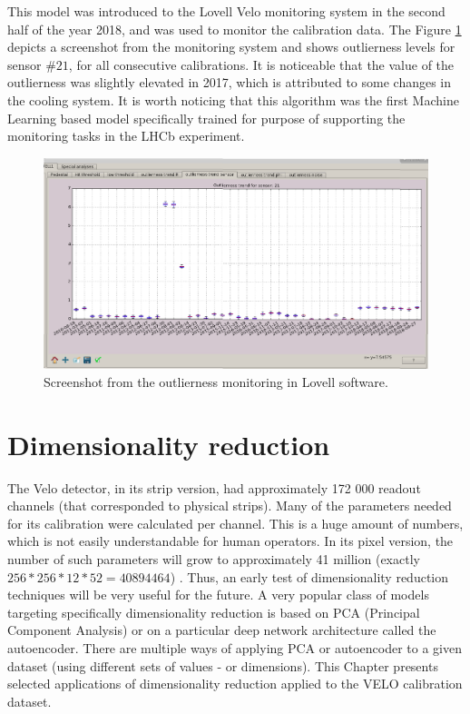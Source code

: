This model was introduced to the Lovell Velo monitoring system in the second half of the year 2018, and was used to monitor the calibration data. The Figure \ref{plot:gui} depicts a screenshot from the monitoring system and shows outlierness levels for sensor $\#21$, for all consecutive calibrations. It is noticeable that the value of the outlierness was slightly elevated in 2017, which is attributed to some changes in the cooling system. It is worth noticing that this algorithm was the first Machine Learning based model specifically trained for purpose of supporting the monitoring tasks in the LHCb experiment. 


\begin{figure}
    \centering
    \includegraphics[width=0.9\linewidth]{figures/chapter4/outlierness/calina_lovell_screenshot.png}
    \caption{Screenshot from the outlierness monitoring in Lovell software.}
    \label{plot:gui}
  \end{figure}








\section{Dimensionality reduction}
\label{chap4:dimred}

The Velo detector, in its strip version, had approximately 172 000 readout channels (that corresponded to physical strips). Many of the parameters needed for its calibration were calculated per channel. This is a huge amount of numbers, which is not easily understandable for human operators.
In its pixel version, the number of such parameters will grow to approximately 41 million (exactly $256*256*12*52 = 40894464$) \cite{Collaboration:1624070}.
Thus, an early test of dimensionality reduction techniques will be very useful for the future. A very popular class of models targeting specifically dimensionality reduction is based on PCA (Principal Component Analysis) or on a particular deep network architecture called the autoencoder.
There are multiple ways of applying PCA or autoencoder to a given dataset (using different sets of values - or dimensions).
This Chapter presents selected applications of dimensionality reduction applied to the VELO calibration dataset.

